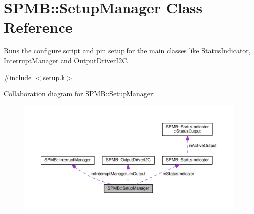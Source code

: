 \hypertarget{classSPMB_1_1SetupManager}{}\section{S\+P\+MB\+:\+:Setup\+Manager Class Reference}
\label{classSPMB_1_1SetupManager}


Runs the configure script and pin setup for the main classes like \hyperlink{classSPMB_1_1StatusIndicator}{Status\+Indicator}, \hyperlink{classSPMB_1_1InterruptManager}{Interrupt\+Manager} and \hyperlink{classSPMB_1_1OutputDriverI2C}{Output\+Driver\+I2C}.  




{\ttfamily \#include $<$setup.\+h$>$}



Collaboration diagram for S\+P\+MB\+:\+:Setup\+Manager\+:\nopagebreak
\begin{figure}[H]
\begin{center}
\leavevmode
\includegraphics[width=350pt]{classSPMB_1_1SetupManager__coll__graph}
\end{center}
\end{figure}
